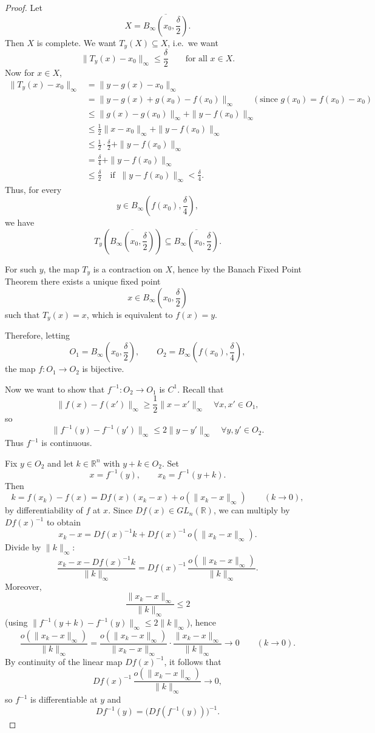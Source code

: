 \documentclass[11pt,openany]{book}
\theoremstyle{plain}
\theoremstyle{definition}
\theoremstyle{remark}
\begin{document}
\begin{proof}
Let
\[
X=\overline{B_\infty\!\left(x_0,\frac{\delta}{2}\right)}.
\]
Then $X$ is complete. We want $T_y(X)\subseteq X$, i.e.\ we want
\[
\|T_y(x)-x_0\|_\infty\le \frac{\delta}{2}
\qquad \text{for all }x\in X.
\]
Now for $x\in X$,
\begin{align*}
\|T_y(x)-x_0\|_\infty
&=\|y-g(x)-x_0\|_\infty \\
&=\|y-g(x)+g(x_0)-f(x_0)\|_\infty
\qquad (\text{since } g(x_0)=f(x_0)-x_0)\\
&\le \|g(x)-g(x_0)\|_\infty + \|y-f(x_0)\|_\infty \\
&\le \frac12\|x-x_0\|_\infty + \|y-f(x_0)\|_\infty \\
&\le \frac12\cdot \frac{\delta}{2} + \|y-f(x_0)\|_\infty \\
&= \frac{\delta}{4} + \|y-f(x_0)\|_\infty \\
&\le \frac{\delta}{2}
\quad\text{if }\ \|y-f(x_0)\|_\infty<\frac{\delta}{4}.
\end{align*}
Thus, for every
\[
y\in B_\infty\!\left(f(x_0),\frac{\delta}{4}\right),
\]
we have
\[
T_y\!\left(\overline{B_\infty\!\left(x_0,\frac{\delta}{2}\right)}\right)
\subseteq
\overline{B_\infty\!\left(x_0,\frac{\delta}{2}\right)}.
\]

For such $y$, the map $T_y$ is a contraction on $X$, hence by the Banach Fixed Point Theorem there exists a unique fixed point
\[
x\in B_\infty\!\left(x_0,\frac{\delta}{2}\right)
\]
such that $T_y(x)=x$, which is equivalent to $f(x)=y$.

Therefore, letting
\[
O_1 = B_\infty\!\left(x_0,\frac{\delta}{2}\right),
\qquad
O_2 = B_\infty\!\left(f(x_0),\frac{\delta}{4}\right),
\]
the map $f:O_1\to O_2$ is bijective.

Now we want to show that $f^{-1}:O_2\to O_1$ is $C^1$. Recall that
\[
\|f(x)-f(x')\|_\infty \ge \frac12 \|x-x'\|_\infty
\quad \forall x,x'\in O_1,
\]
so
\[
\|f^{-1}(y)-f^{-1}(y')\|_\infty \le 2\|y-y'\|_\infty
\quad \forall y,y'\in O_2.
\]
Thus $f^{-1}$ is continuous.

Fix $y\in O_2$ and let $k\in\mathbb{R}^n$ with $y+k\in O_2$. Set
\[
x=f^{-1}(y), \qquad x_k=f^{-1}(y+k).
\]
Then
\[
k
= f(x_k)-f(x)
= Df(x)(x_k-x) + o(\|x_k-x\|_\infty)
\qquad (k\to 0),
\]
by differentiability of $f$ at $x$. Since $Df(x)\in GL_n(\mathbb{R})$, we can multiply by $Df(x)^{-1}$ to obtain
\[
x_k-x
= Df(x)^{-1}k + Df(x)^{-1}\,o(\|x_k-x\|_\infty).
\]
Divide by $\|k\|_\infty$:
\[
\frac{x_k-x - Df(x)^{-1}k}{\|k\|_\infty}
= Df(x)^{-1}\,\frac{o(\|x_k-x\|_\infty)}{\|k\|_\infty}.
\]
Moreover,
\[
\frac{\|x_k-x\|_\infty}{\|k\|_\infty}
\le 2
\]
(using $\|f^{-1}(y+k)-f^{-1}(y)\|_\infty\le 2\|k\|_\infty$), hence
\[
\frac{o(\|x_k-x\|_\infty)}{\|k\|_\infty}
=
\frac{o(\|x_k-x\|_\infty)}{\|x_k-x\|_\infty}\cdot
\frac{\|x_k-x\|_\infty}{\|k\|_\infty}
\longrightarrow 0 \qquad (k\to 0).
\]
By continuity of the linear map $Df(x)^{-1}$, it follows that
\[
Df(x)^{-1}\,\frac{o(\|x_k-x\|_\infty)}{\|k\|_\infty}\longrightarrow 0,
\]
so $f^{-1}$ is differentiable at $y$ and
\[
Df^{-1}(y)=\bigl(Df(f^{-1}(y))\bigr)^{-1}.
\]


\end{proof}
\end{document}
